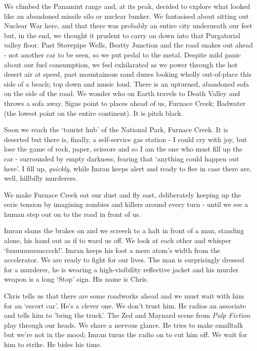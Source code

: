 \documentclass[a5paper,titlepage,draft]{book}
\begin{document}
We climbed the Panamint range and, at its peak, decided to explore what looked like an abandoned missile silo or nuclear bunker.  We fantasised about sitting out Nuclear War here, and that there was probably an entire city underneath our feet but, in the end, we thought it prudent to carry on down into that Purgatorial valley floor.  Past Stovepipe Wells, Beatty Junction and the road snakes out ahead - not another car to be seen, so we put pedal to the metal.  Despite mild panic about our fuel consumption, we feel exhilarated as we power through the hot desert air at speed, past mountainous sand dunes looking wholly out-of-place this side of a beach; top down and music loud.  There is an upturned, abandoned sofa on the side of the road.  We wonder who on Earth travels to Death Valley and throws a sofa away.  Signs point to places ahead of us, Furnace Creek; Badwater (the lowest point on the entire continent).  It is pitch black.

Soon we reach the `tourist hub' of the National Park, Furnace Creek.  It is deserted but there is, finally, a self-service gas station - I could cry with joy, but lose the game of rock, paper, scissors and so I am the one who must fill up the car - surrounded by empty darkness, fearing that `anything could happen out here'.  I fill up, \emph{quickly}, while Imran keeps alert and ready to flee in case there are, well, hillbilly murderers.

We make Furnace Creek eat our dust and fly east, deliberately keeping up the eerie tension by imagining zombies and killers around every turn - until we see a human step out on to the road in front of us.

Imran slams the brakes on and we screech to a halt in front of a man, standing alone, his hand out as if to ward us off.  We look at each other and whisper `fuuuuuuuuucccck!'.  Imran keeps his foot a mere atom's width from the accelerator.  We are ready to fight for our lives.  The man is surprisingly dressed for a murderer, he is wearing a high-visibility reflective jacket and his murder weapon is a long `Stop' sign.  His name is Chris.

Chris tells us that there are some roadworks ahead and we must wait with him for an `escort car'.  He's a clever one.  We don't trust him.  He radios an associate and tells him to 'bring the truck'.  The Zed and Maynard scene from \emph{Pulp Fiction} play through our heads.  We share a nervous glance.  He tries to make smalltalk but we're not in the mood; Imran turns the radio on to cut him off.  We wait for him to strike.  He bides his time.
\end{document}
